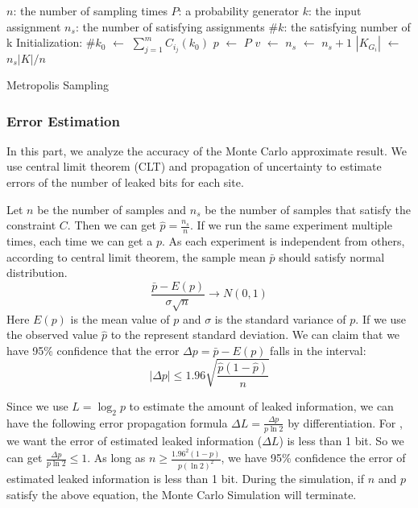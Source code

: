 \IncMargin{1em}
\begin{algorithm}
\SetAlgoLined
\DontPrintSemicolon


$n$: the number of sampling times \;
$P$: a probability generator \;
$k$: the input assignment \;
$n_{s}$: the number of satisfying assignments \;
$\#k$: the satisfying number of k  \; 
Initialization: \;
$\#{k_0}$ $\leftarrow$ $\sum_{j=1}^{m}C_{i_j}(k_0)$ \;
 {
      $p$ $\leftarrow$ $P$ \;
      {
        $v$ $\leftarrow$  {}
      }
      {$n_{s}$ $\leftarrow$ $n_{s} + 1$}
}
$|K_{G_{i}}|$ $\leftarrow$ $n_s|K| / n$
\caption{Metropolis Sampling}
\end{algorithm}
\DecMargin{1em}

\subsubsection{Error Estimation}
In this part, we analyze the accuracy of the Monte Carlo approximate
result. We use central limit theorem (CLT) and propagation of uncertainty 
to estimate errors of the number of leaked bits for each site.

Let $n$ be the number of samples and $n_s$ be the number of samples
that satisfy the constraint $C$. Then we can get $\hat{p} = \frac{n_s}{n}$.
If we run the same experiment multiple times, each time we can
get a $p$. 
As each experiment is independent from others, according to 
central limit theorem, the sample mean $\bar{p}$ should 
satisfy normal distribution.
$$ \frac{\bar{p}-E(p)}{\sigma\sqrt{n}} \rightarrow N(0,1) $$
Here $E(p)$ is the mean value of $p$ and $\sigma$ is the standard 
variance of $p$. If we use the observed value $\hat{p}$ 
to the represent standard deviation.
We can claim that we have 95\% confidence that the error 
$\Delta p= \bar{p} - E(p)$ falls in the interval:
$$ |\Delta p| \leq 1.96\sqrt{\frac{ \hat{p} (1- \hat{p} )}{n}}$$

Since we use $L = \log_{2}p$ to estimate the amount of leaked information,
we can have the following error propagation formula $\Delta L = \frac{\Delta p}{p\ln2}$
by differentiation. For \tool, we want the error of estimated leaked information ($\Delta L$) is 
less than 1 bit. So we can get $\frac{\Delta p}{p\ln2} \leq 1$. As long as
$ n \geq \frac{1.96^2(1-p)}{p(\ln2)^2}$, we have 95\% confidence the error of estimated 
leaked information is less than 1 bit. During the simulation, if $n$ and $p$ satisfy
the above equation, the Monte Carlo Simulation will terminate.



